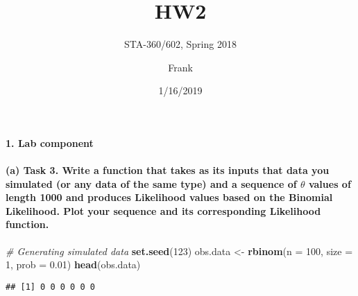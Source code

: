 \documentclass[]{article}
\title{HW2}
\subtitle{STA-360/602, Spring 2018}
\author{Frank}
\date{1/16/2019}
\newenvironment{Shaded}{\begin{snugshade}}{\end{snugshade}}
\newcommand{\KeywordTok}[1]{\textcolor[rgb]{0.13,0.29,0.53}{\textbf{#1}}}
\newcommand{\DataTypeTok}[1]{\textcolor[rgb]{0.13,0.29,0.53}{#1}}
\newcommand{\DecValTok}[1]{\textcolor[rgb]{0.00,0.00,0.81}{#1}}
\newcommand{\FloatTok}[1]{\textcolor[rgb]{0.00,0.00,0.81}{#1}}
\newcommand{\StringTok}[1]{\textcolor[rgb]{0.31,0.60,0.02}{#1}}
\newcommand{\CommentTok}[1]{\textcolor[rgb]{0.56,0.35,0.01}{\textit{#1}}}
\newcommand{\NormalTok}[1]{#1}
\let\oldparagraph\paragraph
\renewcommand{\paragraph}[1]{\oldparagraph{#1}\mbox{}}
\begin{document}
\maketitle

\paragraph{1. Lab component}\label{lab-component}

\paragraph{\texorpdfstring{(a) Task 3. Write a function that takes as
its inputs that data you simulated (or any data of the same type) and a
sequence of \(\theta\) values of length 1000 and produces Likelihood
values based on the Binomial Likelihood. Plot your sequence and its
corresponding Likelihood
function.}{(a) Task 3. Write a function that takes as its inputs that data you simulated (or any data of the same type) and a sequence of \textbackslash{}theta values of length 1000 and produces Likelihood values based on the Binomial Likelihood. Plot your sequence and its corresponding Likelihood function.}}\label{a-task-3.-write-a-function-that-takes-as-its-inputs-that-data-you-simulated-or-any-data-of-the-same-type-and-a-sequence-of-theta-values-of-length-1000-and-produces-likelihood-values-based-on-the-binomial-likelihood.-plot-your-sequence-and-its-corresponding-likelihood-function.}

\begin{Shaded}
\begin{Highlighting}[]
\CommentTok{# Generating simulated data}
\KeywordTok{set.seed}\NormalTok{(}\DecValTok{123}\NormalTok{)}
\NormalTok{obs.data <-}\StringTok{ }\KeywordTok{rbinom}\NormalTok{(}\DataTypeTok{n =} \DecValTok{100}\NormalTok{, }\DataTypeTok{size =} \DecValTok{1}\NormalTok{, }\DataTypeTok{prob =} \FloatTok{0.01}\NormalTok{)}
\KeywordTok{head}\NormalTok{(obs.data)}
\end{Highlighting}
\end{Shaded}

\begin{verbatim}
## [1] 0 0 0 0 0 0
\end{verbatim}
\end{document}
